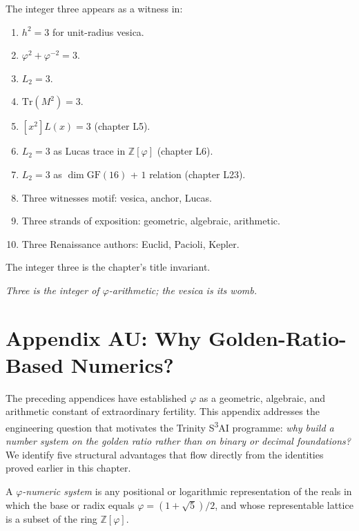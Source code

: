 The integer three appears as a witness in:

\begin{enumerate}
  \item $h^2 = 3$ for unit-radius vesica.
  \item $\varphi^2 + \varphi^{-2} = 3$.
  \item $L_2 = 3$.
  \item $\mathrm{Tr}(M^2) = 3$.
  \item $[x^2] L(x) = 3$ (chapter L5).
  \item $L_2 = 3$ as Lucas trace in $\mathbb{Z}[\varphi]$ (chapter L6).
  \item $L_2 = 3$ as $\dim \mathrm{GF}(16)$ + $1$ relation (chapter L23).
  \item Three witnesses motif: vesica, anchor, Lucas.
  \item Three strands of exposition: geometric, algebraic, arithmetic.
  \item Three Renaissance authors: Euclid, Pacioli, Kepler.
\end{enumerate}

The integer three is the chapter's title invariant.

\bigskip
\centerline{\textit{Three is the integer of $\varphi$-arithmetic; the vesica is its womb.}}
\bigskip


\section*{Appendix AU: Why Golden-Ratio-Based Numerics?}
\label{fa_01:sec:01-app-AU}

The preceding appendices have established $\varphi$ as a geometric,
algebraic, and arithmetic constant of extraordinary fertility. This
appendix addresses the engineering question that motivates the
Trinity S\textsuperscript{3}AI programme: \emph{why build a number
system on the golden ratio rather than on binary or decimal
foundations?} We identify five structural advantages that flow
directly from the identities proved earlier in this chapter.

\begin{definition}
\label{fa_01:def:phi-numerics}
A \emph{$\varphi$-numeric system} is any positional or logarithmic
representation of the reals in which the base or radix equals
$\varphi = (1+\sqrt{5})/2$, and whose representable lattice is a
subset of the ring $\mathbb{Z}[\varphi]$.
\end{definition}

